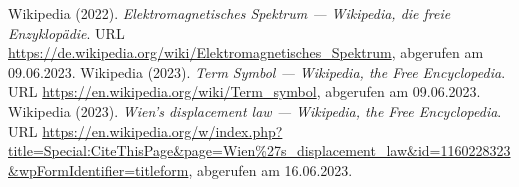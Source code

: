 \documentclass[../main.tex]{subfiles}
\begin{document}
\begin{thebibliography}{99}
		 Wikipedia (2022). \emph{Elektromagnetisches Spektrum --- Wikipedia{,} die freie Enzyklopädie}. URL \url{https://de.wikipedia.org/wiki/Elektromagnetisches_Spektrum}, abgerufen am 09.06.2023.
		 Wikipedia (2023). \emph{Term Symbol --- Wikipedia{,} the Free Encyclopedia}. URL \url{https://en.wikipedia.org/wiki/Term_symbol}, abgerufen am 09.06.2023.
		 Wikipedia (2023). \emph{Wien's displacement law --- Wikipedia{,} the Free Encyclopedia}. URL \url{https://en.wikipedia.org/w/index.php?title=Special:CiteThisPage&page=Wien%27s_displacement_law&id=1160228323&wpFormIdentifier=titleform}, abgerufen am 16.06.2023.

		
	\end{thebibliography}
\end{document}
